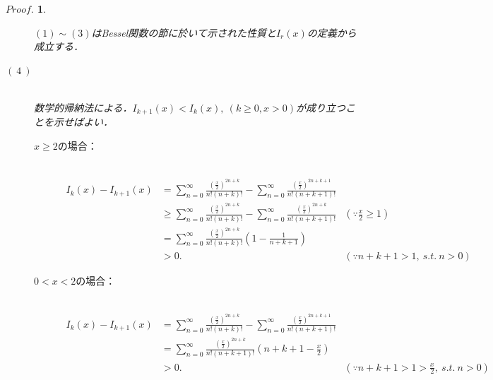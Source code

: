 \documentclass[a4j,papersize,disablejfam,slide,14pt]{jsarticle}
\newtheorem{Proof}{$Proof.$}
\begin{document}
    \begin{Proof}
    	\begin{description}
        	\item[]
        	$(1) \sim (3)$は{\rm Bessel}関数の節に於いて示された性質と$I_r(x)$の定義から成立する．
            
            \item[$(\ 4\ )$]\mbox{}\\
            	数学的帰納法による．$I_{k+1}(x) < I_k(x),\ (k \geq 0, x > 0)$が成り立つことを示せばよい．\\
                \begin{description}
                	\item[$x \geq 2$の場合：]\mbox{}\\
                		\begin{align}
                			I_k(x) - I_{k+1}(x) &= \sum_{n=0}^{\infty} \frac{\left( \frac{x}{2} \right)^{2n+k}}{n!(n+k)!} -
                    			\sum_{n=0}^{\infty} \frac{\left( \frac{x}{2} \right)^{2n+k+1}}{n!(n+k+1)!} \\
                    		&\geq \sum_{n=0}^{\infty} \frac{\left( \frac{x}{2} \right)^{2n+k}}{n!(n+k)!} -
                    			\sum_{n=0}^{\infty} \frac{\left( \frac{x}{2} \right)^{2n+k}}{n!(n+k+1)!} & (\because \frac{x}{2} \geq 1) \\
                            &= \sum_{n=0}^{\infty} \frac{\left( \frac{x}{2} \right)^{2n+k}}{n!(n+k)!} \left( 1 - \frac{1}{n+k+1} \right) \\
                            &> 0. & (\because n+k+1 > 1,\ s.t.\ n > 0)
                		\end{align}
                    \item[$0 < x < 2$の場合：]\mbox{}\\
                    	\begin{align}
                    		I_k(x) - I_{k+1}(x) &= \sum_{n=0}^{\infty} \frac{\left( \frac{x}{2} \right)^{2n+k}}{n!(n+k)!} -
                    			\sum_{n=0}^{\infty} \frac{\left( \frac{x}{2} \right)^{2n+k+1}}{n!(n+k+1)!} \\
                        	&= \sum_{n=0}^{\infty} \frac{\left( \frac{x}{2} \right)^{2n+k}}{n!(n+k+1)!} \left( n+k+1 - \frac{x}{2} \right) \\
                        	&> 0. & (\because n+k+1 > 1 > \frac{x}{2} ,\ s.t.\ n > 0)
                        \end{align}
                \end{description}

\end{description}
\end{Proof}
\end{document}
